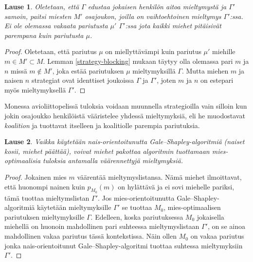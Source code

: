 \documentclass[finnish]{tktltiki2}
\newtheorem{lau}{Lause}
\theoremstyle{definition}
\theoremstyle{remark}
\begin{document}
\begin{lau}\cite[s. 593]{Balinski}
	Oletetaan, että $\Gamma$ edustaa jokaisen henkilön aitoa mieltymystä ja $\Gamma'$ samoin, paitsi miesten $M'$ osajoukon, joilla on vaihtoehtoinen mieltymys $\Gamma'$:ssa. Ei ole olemassa vakaata pariutusta $\mu'$ $\Gamma'$:ssa jota kaikki miehet pitäisivät parempana kuin pariutusta $\mu$.
\end{lau}
\begin{proof}
	Oletetaan, että pariutus $\mu$ on miellyttävämpi kuin pariutus $\mu'$ miehille $m \in M' \subset M$. Lemman \ref{strategy-blocking} mukaan täytyy olla olemassa pari $m$ ja $n$ missä $m \notin M'$, joka estää pariutuksen $\mu$ mieltymyksillä $\Gamma$. Mutta miehen $m$ ja naisen $n$ strategiat ovat identtiset joukoissa $\Gamma$ ja $\Gamma'$, joten $m$ ja $n$ on estepari myös mieltymyksellä $\Gamma'$.
\end{proof}

Monessa avioliittopelissä tuloksia voidaan muunnella strategioilla vain silloin kun jokin osajoukko henkilöistä vääristelee yhdessä mieltymyksiä, eli he muodostavat \emph{koalition} ja tuottavat itselleen ja koalitiolle parempia pariutuksia.

\begin{lau}\cite[s. 58]{gusfield1989stable}
	Vaikka käytetään nais-orientoitunutta Gale--Shapley-algoritmiä (naiset kosii, miehet päättää), voivat miehet pakottaa algoritmin tuottamaan mies-optimaalisia tuloksia antamalla väärennettyjä mieltymyksiä.
\end{lau}

\begin{proof}
	Jokainen mies $m$ väärentää mieltymyslistansa. Nämä miehet ilmoittavat, että huonompi nainen kuin $p_{M_0}(m)$ on hylättävä ja ei sovi miehelle pariksi, tämä tuottaa mieltymslistan $\Gamma'$. Jos mies-orientoitunutta Gale--Shapley-algoritmiä käytetään mieltymyksille $\Gamma'$ se tuottaa $M_0$, mies-optimaalisen pariutuksen mieltymyksille $\Gamma$. Edelleen, koska pariutuksessa $M_0$ jokaisella miehellä on huonoin mahdollinen pari suhteessa mieltymyslistaan $\Gamma'$, on se ainoa mahdollinen vakaa pariutus tässä kontekstissa. Näin ollen $M_0$ on vakaa pariutus jonka nais-orientoitunut Gale--Shapley-algoritmi tuottaa suhtessa mieltymyksiin $\Gamma'$.
\end{proof}
\end{document}
